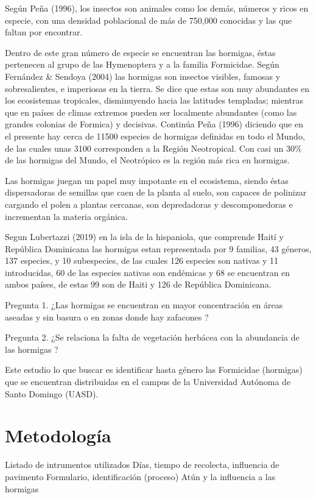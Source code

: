 \documentclass[11pt,]{article}
\begin{document}
Según Peña (1996), los insectos son animales como los demás, números y
ricos en especie, con una densidad poblacional de más de 750,000
conocidas y las que faltan por encontrar.

Dentro de este gran número de especie se encuentran las hormigas, éstas
pertenecen al grupo de las Hymenoptera y a la familia Formicidae. Según
Fernández \& Sendoya (2004) las hormigas son insectos visibles, famosas
y sobresalientes, e imperiosas en la tierra. Se dice que estas son muy
abundantes en los ecosistemas tropicales, disminuyendo hacia las
latitudes templadas; mientras que en países de climas extremos pueden
ser localmente abundantes (como las grandes colonias de Formica) y
decisivas. Continúa Peña (1996) diciendo que en el presente hay cerca de
11500 especies de hormigas definidas en todo el Mundo, de las cuales
unas 3100 corresponden a la Región Neotropical. Con casi un 30\% de las
hormigas del Mundo, el Neotrópico es la región más rica en hormigas.

Las hormigas juegan un papel muy impotante en el ecosistema, siendo
éstas dispersadoras de semillas que caen de la planta al suelo, son
capaces de polinizar cargando el polen a plantas cercanas, son
depredadoras y descomponedoras e incrementan la materia orgánica.

Segun Lubertazzi (2019) en la isla de la hispaniola, que comprende Haití
y República Dominicana las hormigas estan representada por 9 familias,
43 géneros, 137 especies, y 10 subespecies, de las cuales 126 especies
son nativas y 11 introducidas, 60 de las especies nativas son endémicas
y 68 se encuentran en ambos países, de estas 99 son de Haiti y 126 de
República Dominicana.

Pregunta 1. ¿Las hormigas se encuentran en mayor concentración en áreas
aseadas y sin basura o en zonas donde hay zafacones ?

Pregunta 2. ¿Se relaciona la falta de vegetación herbácea con la
abundancia de las hormigas ?

Este estudio lo que buscar es identificar hasta género las Formicidae
(hormigas) que se encuentran distribuidas en el campus de la Universidad
Autónoma de Santo Domingo (UASD).

\section{Metodología}\label{metodologuxeda}

Listado de intrumentos utilizados Días, tiempo de recolecta, influencia
de pavimento Formulario, identificación (proceso) Atún y la influencia a
las hormigas
\end{document}
